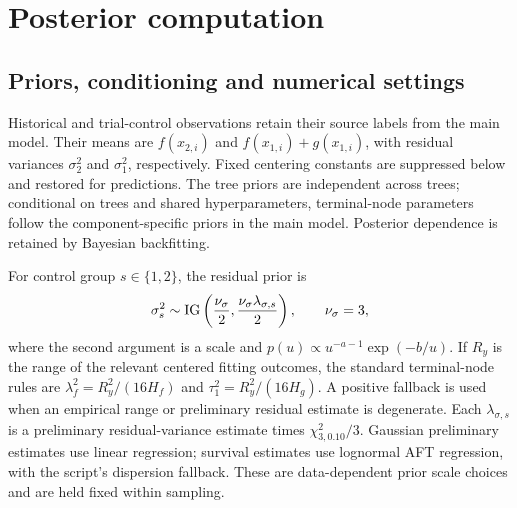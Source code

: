 \section{Posterior computation}\label{sec:A}
\subsection{Priors, conditioning and numerical settings}\label{sec:A.1}
Historical and trial-control observations retain their source labels from the main model. Their means are $f(x_{2,i})$ and $f(x_{1,i})+g(x_{1,i})$, with residual variances $\sigma_{2}^2$ and $\sigma_{1}^2$, respectively. Fixed centering constants are suppressed below and restored for predictions. The tree priors are independent across trees; conditional on trees and shared hyperparameters, terminal-node parameters follow the component-specific priors in the main model. Posterior dependence is retained by Bayesian backfitting.

For control group $s\in\{1,2\}$, the residual prior is
\begin{equation}
\sigma_{s}^2\sim\operatorname{IG}\left(\frac{\nu_\sigma}{2},\frac{\nu_\sigma\lambda_{\sigma,s}}{2}\right),\qquad\nu_\sigma=3,
\end{equation}
where the second argument is a scale and $p(u)\propto u^{-a-1}\exp(-b/u)$. If $R_y$ is the range of the relevant centered fitting outcomes, the standard terminal-node rules are $\lambda_f^2=R_y^2/(16H_f)$ and $\tau_1^2=R_y^2/(16H_g)$. A positive fallback is used when an empirical range or preliminary residual estimate is degenerate. Each $\lambda_{\sigma,s}$ is a preliminary residual-variance estimate times $\chi^2_{3,0.10}/3$. Gaussian preliminary estimates use linear regression; survival estimates use lognormal AFT regression, with the script's dispersion fallback. These are data-dependent prior scale choices and are held fixed within sampling.

